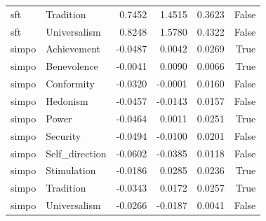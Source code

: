 \begin{tabular}{llrrrr}
sft & Tradition & 0.7452 & 1.4515 & 0.3623 & False \\
sft & Universalism & 0.8248 & 1.5780 & 0.4322 & False \\
simpo & Achievement & -0.0487 & 0.0042 & 0.0269 & True \\
simpo & Benevolence & -0.0041 & 0.0090 & 0.0066 & True \\
simpo & Conformity & -0.0320 & -0.0001 & 0.0160 & False \\
simpo & Hedonism & -0.0457 & -0.0143 & 0.0157 & False \\
simpo & Power & -0.0464 & 0.0011 & 0.0251 & True \\
simpo & Security & -0.0494 & -0.0100 & 0.0201 & False \\
simpo & Self\_direction & -0.0602 & -0.0385 & 0.0118 & False \\
simpo & Stimulation & -0.0186 & 0.0285 & 0.0236 & True \\
simpo & Tradition & -0.0343 & 0.0172 & 0.0257 & True \\
simpo & Universalism & -0.0266 & -0.0187 & 0.0041 & False \\
\bottomrule
\end{tabular}
